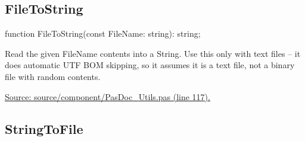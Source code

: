 \documentclass{report}
\newif\ifpdf
\begin{document}
\subsection*{FileToString}
\fi
\label{PasDoc_Utils-FileToString}
\begin{list}{}{
\setlength{\itemindent}{0cm}
\setlength{\listparindent}{0cm}
\setlength{\leftmargin}{\evensidemargin}
\addtolength{\leftmargin}{\tmplength}
\settowidth{\labelsep}{X}
\addtolength{\leftmargin}{\labelsep}
\setlength{\labelwidth}{\tmplength}
}
\item[\textbf{Declaration}\hfill]
\ifpdf
\begin{flushleft}
\fi
\begin{ttfamily}
function FileToString(const FileName: string): string;\end{ttfamily}

\ifpdf
\end{flushleft}
\fi

\par
\item[\textbf{Description}]
Read the given FileName contents into a String. Use this only with text files -- it does automatic UTF BOM skipping, so it assumes it is a text file, not a binary file with random contents.\par
\href{https://github.com/pasdoc/pasdoc/blob/master/source/component/PasDoc_Utils.pas#L117}{Source: source/component/PasDoc{\_}Utils.pas (line 117).}

\end{list}
\ifpdf
\subsection*{\large{\textbf{StringToFile}}\normalsize\hspace{1ex}\hrulefill}
\else
\end{document}
